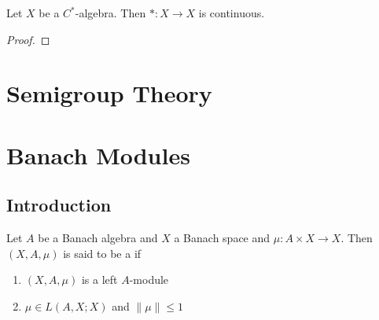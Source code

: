 \documentclass{book}
\begin{document}
	
	\begin{ex}
		Let $X$ be a $C^*$-algebra. Then $*:X \rightarrow X$ is continuous. 
	\end{ex}

	\begin{proof}
		
	\end{proof}

































\newpage
\chapter{Semigroup Theory}
	
	
	
	
	
	
	
	
	
	
	
	
	
	
	
	
	
	
	
	
	
	
	
	
	
	
	
	
	
	
	
	\newpage
	
	\chapter{Banach Modules}
	
	\section{Introduction}
	
	\begin{defn}
		Let $A$ be a Banach algebra and $X$ a Banach space and $\mu: A \times X \rightarrow X$. Then $(X, A, \mu)$ is said to be a  if 
		\begin{enumerate}
			\item $(X, A, \mu)$ is a left $A$-module
			\item $\mu \in L(A, X; X)$ and $\|\mu\| \leq 1$
		\end{enumerate}
	\end{defn}
	
\end{document}
